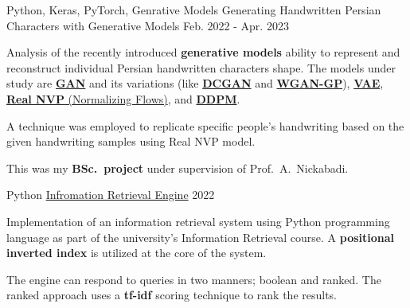 

\begin{cventries}

  \cventry
    {Python, Keras, PyTorch, Genrative Models} %
    {Generating Handwritten Persian Characters with Generative Models} %
    {} %
    {Feb. 2022 - Apr. 2023} %
    {
      \begin{cvitems} %
      	\item {Analysis of the recently introduced \textbf{generative models} ability to represent and reconstruct individual Persian handwritten characters shape. The models under study are \href{https://arxiv.org/abs/1406.2661}{\textbf{GAN}} and its variations (like \href{https://arxiv.org/abs/1511.06434}{\textbf{DCGAN}} and \href{https://arxiv.org/abs/1704.00028}{\textbf{WGAN-GP}}), \href{https://arxiv.org/abs/1312.6114}{\textbf{VAE}}, \href{https://arxiv.org/abs/1605.08803}{\textbf{Real NVP} (Normalizing Flows)}, and \href{https://arxiv.org/abs/2006.11239}{\textbf{DDPM}}.}
      	\item{A technique was employed to replicate specific people's handwriting based on the given handwriting samples using Real NVP model.}
      	\item {This was my \textbf{BSc.~project} under supervision of Prof.~A.~Nickabadi.}
      \end{cvitems}
    }

  \cventry
    {Python} %
    {\href{https://github.com/radinshayanfar/AUT-IR}{Infromation Retrieval Engine}} %
    {} %
    {2022} %
    {
      \begin{cvitems} %
      	\item {Implementation of an information retrieval system using Python programming language as part of the university's Information Retrieval course. A \textbf{positional inverted index} is utilized at the core of the system.}
      	\item {The engine can respond to queries in two manners; boolean and ranked. The ranked approach uses a \textbf{tf-idf} scoring technique to rank the results.}
      \end{cvitems}
    }
    

\end{cventries}

